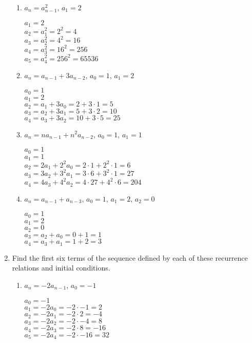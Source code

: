 \documentclass[11pt]{article}
\begin{document}
\begin{enumerate}[label=\textbf{\arabic*.}]
\begin{enumerate}[label=\textbf{\alph*)}]
		\item $a_n = a_{n - 1}^2$, $a_1 = 2$
		
		$a_1 = 2$ \\
		$a_2 = a_1^2 = 2^2 = 4$ \\
		$a_3 = a_2^2 = 4^2 = 16$ \\
		$a_4 = a_3^2 = 16^2 = 256$ \\
		$a_5 = a_4^2 = 256^2 = 65536$
		
		\item $a_n = a_{n - 1} + 3a_{n - 2}$, $a_0 = 1$, $a_1 = 2$
		
		$a_0 = 1$ \\
		$a_1 = 2$ \\
		$a_2 = a_1 + 3a_0 = 2 + 3 \cdot 1 = 5$ \\
		$a_3 = a_2 + 3a_1 = 5 + 3 \cdot 2 = 10$ \\
		$a_4 = a_3 + 3a_2 = 10 + 3 \cdot 5 = 25$
		
		\item $a_n = na_{n - 1} + n^2a_{n - 2}$, $a_0 = 1$, $a_1 = 1$
		
		$a_0 = 1$ \\
		$a_1 = 1$ \\
		$a_2 = 2a_1 + 2^2a_0 = 2 \cdot 1 + 2^2 \cdot 1 = 6$ \\
		$a_3 = 3a_2 + 3^2a_1 = 3 \cdot 6 + 3^2 \cdot 1 = 27$ \\
		$a_4 = 4a_3 + 4^2a_2 = 4 \cdot 27 + 4^2 \cdot 6 = 204$
		
		\item $a_n = a_{n - 1} + a_{n - 3}$, $a_0 = 1$, $a_1 = 2$, $a_2 = 0$
		
		$a_0 = 1$ \\
		$a_1 = 2$ \\
		$a_2 = 0$ \\
		$a_3 = a_2 + a_0 = 0 + 1 = 1$ \\
		$a_4 = a_3 + a_1 = 1 + 2 = 3$
	\end{enumerate}

	\item Find the first six terms of the sequence defined by each of these recurrence relations and initial conditions.
	
	\begin{enumerate}[label=\textbf{\alph*)}]
		\item $a_n = -2a_{n - 1}$, $a_0 = -1$
		
		$a_0 = -1$ \\
		$a_1 = -2a_0 = -2 \cdot -1 = 2$ \\
		$a_2 = -2a_1 = -2 \cdot 2 = -4$ \\
		$a_3 = -2a_2 = -2 \cdot -4 = 8$ \\
		$a_4 = -2a_3 = -2 \cdot 8 = -16$ \\
		$a_5 = -2a_4 = -2 \cdot -16 = 32$
		

\end{enumerate}
\end{enumerate}
\end{document}
